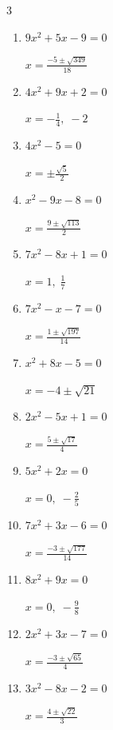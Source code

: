 \begin{multicols}{3}
\begin{enumerate}
  \item $9x^{2}+5x-9=0$

        $\displaystyle x=\frac{-5\pm \sqrt{349}}{18}$

  \item $4x^{2}+9x+2=0$

        $\displaystyle x=-\frac{1}{4}, \; -2$

  \item $4x^{2}-5=0$

        $\displaystyle x=\pm \frac{\sqrt{5}}{2}$

  \item $x^{2}-9x-8=0$

        $\displaystyle x=\frac{9\pm \sqrt{113}}{2}$

\columnbreak %

  \item $7x^{2}-8x+1=0$

        $\displaystyle x=1, \; \frac{1}{7}$

  \item $7x^{2}-x-7=0$

        $\displaystyle x=\frac{1\pm \sqrt{197}}{14}$

  \item $x^{2}+8x-5=0$

        $\displaystyle x=-4\pm \sqrt{21}$

  \item $2x^{2}-5x+1=0$

        $\displaystyle x=\frac{5\pm \sqrt{17}}{4}$

  \item $5x^{2}+2x=0$

        $\displaystyle x=0, \; -\frac{2}{5}$

  \item $7x^{2}+3x-6=0$

        $\displaystyle x=\frac{-3\pm \sqrt{177}}{14}$

  \item $8x^{2}+9x=0$

        $\displaystyle x=0, \; -\frac{9}{8}$

\columnbreak %

  \item $2x^{2}+3x-7=0$

        $\displaystyle x=\frac{-3\pm \sqrt{65}}{4}$

  \item $3x^{2}-8x-2=0$

        $\displaystyle x=\frac{4\pm \sqrt{22}}{3}$


\end{enumerate}
\end{multicols}

